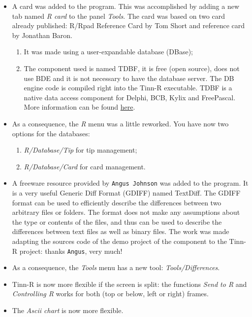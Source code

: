 \begin{itemize}
  \item A \RR{} card was added to the program.
    This was accomplished by adding a new tab
    named \textit{R card} to the panel \textit{Tools}.
    The \RR{} card was based on two \RR{} card already published:
    R/Rpad Reference Card by Tom Short and \RR{} reference card by Jonathan Baron.
    \begin{enumerate}
      \item It was made using a user-expandable database (DBase);
      \item The component used is named TDBF, it is free (open source), does
        not use BDE and it is not necessary to have the database server. The
        DB engine code is compiled right into the Tinn-R executable. TDBF is
        a native data access component for Delphi, BCB, Kylix and FreePascal.
        More information can be found
        \href{https://sourceforge.net/projects/tdbf/}{here}.
    \end{enumerate}
  \item As a consequence, the \textit{R} menu was a little reworked. You
    have now two options for the databases:
    \begin{enumerate}
      \item \textit{R/Database/Tip} for tip management;
      \item \textit{R/Database/Card} for \RR{} card management.
    \end{enumerate}
  \item A freeware resource provided by \texttt{Angus Johnson} was added
    to the program. It is a very useful Generic Diff Format (GDIFF)
    named TextDiff. The GDIFF format can be used to efficiently describe
    the differences between two arbitrary files or folders. The format
    does not make any assumptions about the type or contents of the files,
    and thus can be used to describe the differences between text files
    as well as binary files. The work was made adapting the sources code
    of the demo project of the component to the Tinn-R project: thanks
    \texttt{Angus}, very much!
  \item As a consequence, the \textit{Tools} menu has a new tool:
    \textit{Tools/Differences}.
  \item Tinn-R is now more flexible if the screen is split: the
    functions \textit{Send to R} and \textit{Controlling R} works for
    both (top or below, left or right) frames.
  \item The \textit{Ascii chart} is now more flexible.

\end{itemize}
